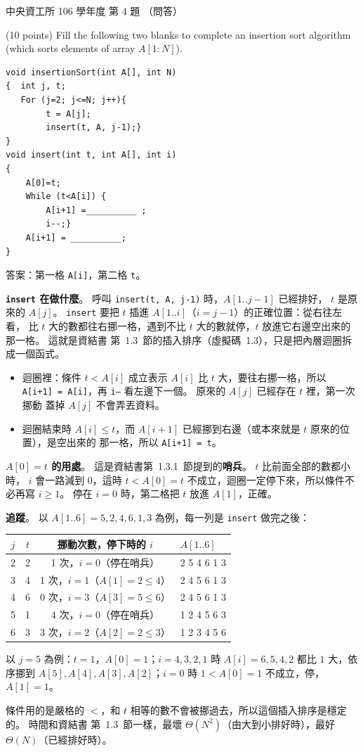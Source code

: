 \begin{pastexam}[label={px:ncu-106-dsa-04}]{中央資工所 106 學年度 第 4 題}
（問答）

(10 points) Fill the following two blanks to complete an insertion sort algorithm (which sorts
elements of array $A[1{:}N]$).
\begin{verbatim}
void insertionSort(int A[], int N)
{  int j, t;
   For (j=2; j<=N; j++){
        t = A[j];
        insert(t, A, j-1);}
}
void insert(int t, int A[], int i)
{
    A[0]=t;
    While (t<A[i]) {
        A[i+1] =__________ ;
        i--;}
    A[i+1] = __________;
}
\end{verbatim}
\end{pastexam}

\begin{pastsoln}
答案：第一格 \texttt{A[i]}，第二格 \texttt{t}。

\textbf{\texttt{insert} 在做什麼}。 呼叫 \texttt{insert(t, A, j-1)} 時，$A[1..j-1]$ 已經排好，
$t$ 是原來的 $A[j]$。 \texttt{insert} 要把 $t$ 插進 $A[1..i]$（$i = j - 1$）的正確位置：從右往左看，
比 $t$ 大的數都往右挪一格，遇到不比 $t$ 大的數就停，$t$ 放進它右邊空出來的那一格。 這就是資結書
第~1.3~節的插入排序（虛擬碼~1.3），只是把內層迴圈拆成一個函式。

\begin{itemize}
\item 迴圈裡：條件 $t < A[i]$ 成立表示 $A[i]$ 比 $t$ 大，要往右挪一格，所以
\texttt{A[i+1] = A[i]}，再 \texttt{i--} 看左邊下一個。 原來的 $A[j]$ 已經存在 $t$ 裡，第一次挪動
蓋掉 $A[j]$ 不會弄丟資料。
\item 迴圈結束時 $A[i] \le t$，而 $A[i+1]$ 已經挪到右邊（或本來就是 $t$ 原來的位置），是空出來的
那一格，所以 \texttt{A[i+1] = t}。
\end{itemize}

\textbf{$A[0] = t$ 的用處}。 這是資結書第~1.3.1~節提到的\textbf{哨兵}。 $t$ 比前面全部的數都小時，
$i$ 會一路減到 $0$，這時 $t < A[0] = t$ 不成立，迴圈一定停下來，所以條件不必再寫 $i \ge 1$。
停在 $i = 0$ 時，第二格把 $t$ 放進 $A[1]$，正確。

\textbf{追蹤}。 以 $A[1..6] = 5, 2, 4, 6, 1, 3$ 為例，每一列是 \texttt{insert} 做完之後：
\begin{center}
\begin{tabular}{cccl}
\toprule
$j$ & $t$ & 挪動次數，停下時的 $i$ & $A[1..6]$ \\
\midrule
2 & 2 & 1 次，$i = 0$（停在哨兵） & 2 5 4 6 1 3 \\
3 & 4 & 1 次，$i = 1$（$A[1] = 2 \le 4$） & 2 4 5 6 1 3 \\
4 & 6 & 0 次，$i = 3$（$A[3] = 5 \le 6$） & 2 4 5 6 1 3 \\
5 & 1 & 4 次，$i = 0$（停在哨兵） & 1 2 4 5 6 3 \\
6 & 3 & 3 次，$i = 2$（$A[2] = 2 \le 3$） & 1 2 3 4 5 6 \\
\bottomrule
\end{tabular}
\end{center}
以 $j = 5$ 為例：$t = 1$，$A[0] = 1$；$i = 4, 3, 2, 1$ 時 $A[i] = 6, 5, 4, 2$ 都比 $1$ 大，依序挪到
$A[5], A[4], A[3], A[2]$；$i = 0$ 時 $1 < A[0] = 1$ 不成立，停，$A[1] = 1$。

條件用的是嚴格的 $<$，和 $t$ 相等的數不會被挪過去，所以這個插入排序是穩定的。 時間和資結書
第~1.3~節一樣，最壞 $\Theta(N^2)$（由大到小排好時），最好 $\Theta(N)$（已經排好時）。
\end{pastsoln}
